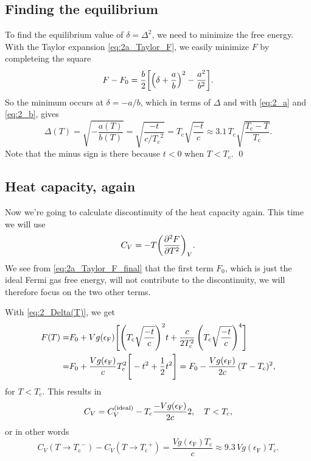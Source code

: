 \documentclass[11pt,letter, swedish, english
]{article}
\newcommand{\Tc}{\ensuremath{T_{\text{c}}}}
\newcommand{\eF}{\ensuremath{\epsilon_{\text{F}}}}
\begin{document}
\subsection{Finding the equilibrium}
To find the equilibrium value of $\delta=\Delta^2$, we need to minimize
the free energy. With the Taylor expansion \eqref{eq:2a_Taylor_F}, we
easily minimize $F$ by completeing the square
\begin{equation}\label{eq:2b_F_compl_sq}
F-F_0=\frac{b}{2}\qty[\qty(\delta+\frac{a}{b})^2-\frac{a^2}{b^2}].
\end{equation}
So the minimum occurs at $\delta=-a/b$, which in terms of $\Delta$ and
with \eqref{eq:2_a} and \eqref{eq:2_b}, gives
\begin{equation}\label{eq:2_Delta(T)}
\Delta(T)=\sqrt{-\frac{a(T)}{b(T)}}
=\sqrt{\frac{-t}{c/\Tc^2}}
=\Tc\sqrt{\frac{-t}{c}}\approx3.1\,\Tc\sqrt{\frac{\Tc-T}{\Tc}}.
\end{equation}
Note that the minus sign is there because $t<0$ when $T<\Tc$.
\qed

\subsection{Heat capacity, again}
Now we're going to calculate discontinuity of the heat capacity
again. This time we will use
\begin{equation}
C_V=-T\qty(\pdv[2]{F}{T})_V.
\end{equation}
We see from \eqref{eq:2a_Taylor_F_final} that the first term $F_0$,
which is just the ideal Fermi gas free energy, will not contribute to
the discontinuity, we will therefore focus on the two other terms. 

With \eqref{eq:2_Delta(T)}, we get
\begin{equation}
\begin{aligned}
F(T)=&F_0+Vg(\eF)\Bigg[
\qty(\Tc\sqrt{\frac{-t}{c}})^2 t+
\frac{c}{2\Tc^2}\,
\qty(\Tc\sqrt{\frac{-t}{c}})^4
\Bigg]\\
=&F_0+\frac{Vg(\eF)}{c}\Tc^2\Bigg[
-t^2+\frac{1}{2}t^2 \Bigg]
=F_0-\frac{Vg(\eF)}{2c}\,(T-\Tc)^2,
\end{aligned}
\end{equation}
for $T<\Tc$.
This results in
\begin{equation}
C_V=C_V^{\text{(ideal)}} - \Tc\frac{-Vg(\eF)}{2c}2
\qcomma
T<\Tc,
\end{equation}
or in other words
\begin{equation}
C_V(T\to\Tc^-)-C_V(T\to\Tc^+)=\frac{Vg(\eF)\Tc}{c}
\approx 9.3\,Vg(\eF)\Tc.
\end{equation}
\end{document}
